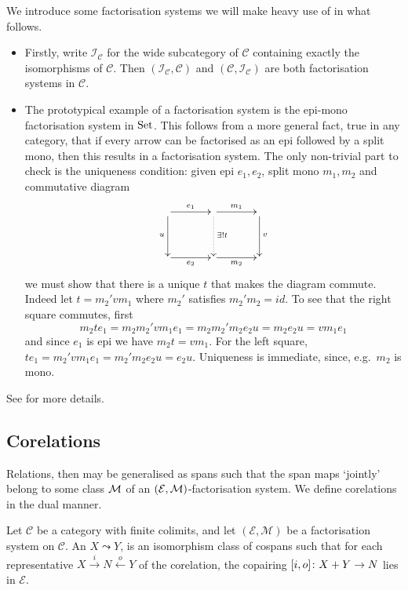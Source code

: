 \begin{examples}
  We introduce some factorisation systems we will make heavy use of in what
  follows.
  \begin{itemize}
    \item Firstly, write $\mathcal I_{\mathcal C}$ for the wide subcategory of
      $\mathcal C$ containing exactly the isomorphisms of $\mathcal C$. Then
      $(\mathcal I_{\mathcal C}, \mathcal C)$ and $(\mathcal C, \mathcal
      I_{\mathcal C})$ are both factorisation systems in $\mathcal C$. 
    
    \item The prototypical example of a factorisation system is the epi-mono
      factorisation system in $\mathrm{Set}$. This follows from a more general fact,
      true in any category, that if every arrow can be factorised as an epi
      followed by a split mono, then this results in a factorisation system.
      The only non-trivial part to check is the uniqueness condition: given epi
      $e_1,e_2$, split mono $m_1,m_2$ and commutative diagram
      \[
	\xymatrixcolsep{3pc}
	\xymatrixrowsep{3pc}
	\xymatrix{
	  \ar[r]^{e_1} \ar[d]_u & \ar[r]^{m_1} \ar@{.>}[d]^{\exists! t} &  \ar[d]^v \\
	  \ar[r]_{e_2}& \ar[r]_{m_2} & 
	}
      \]
      we must show that there is a unique $t$ that makes the diagram commute.
      Indeed let $t= m_2'vm_1$ where $m_2'$ satisfies $m_2'm_2=id$. 
      To see that the right square commutes, first
      \[
	m_2 t e_1 =  m_2 m_2' v m_1 e_1 = m_2 m_2' m_2 e_2 u = m_2 e_2 u = v m_1 e_1
      \]
      and since $e_1$ is epi we have $m_2 t = v m_1$. For the left square,
      $t e_1 = m_2' v m_1 e_1 = m_2' m_2 e_2 u = e_2 u$. Uniqueness is immediate,
      since, e.g.\ $m_2$ is mono. 
\end{itemize}
\end{examples}

See \cite[]{AHS} for more details.


\subsection{Corelations}
Relations, then may be generalised as spans such that the span maps `jointly'
belong to some class $\mathcal M$ of an $(\mathcal E,\mathcal M)$-factorisation system. We
define corelations in the dual manner.

\begin{definition}
  Let $\mathcal C$ be a category with finite colimits, and let $(\mathcal E,
  \mathcal M)$ be a factorisation system on $\mathcal C$. An  $X \leadsto Y$, is an isomorphism class of cospans
  such that for each representative $X \stackrel{i}\longrightarrow N
  \stackrel{o}\longleftarrow Y$ of the corelation, the copairing $[i,o]{\colon} X+Y
  \to N$ lies in $\mathcal E$.
\end{definition}

